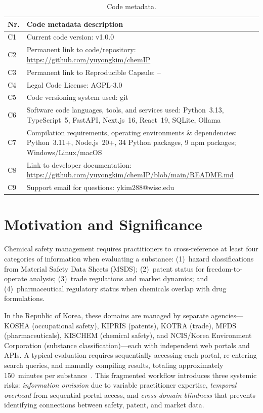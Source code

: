 \documentclass[preprint,12pt]{elsarticle}
\begin{document}
\begin{table}[H]
\caption{Code metadata.}
\label{tab:code_metadata}
\small
\begin{tabular}{@{}lp{9cm}@{}}
\toprule
\textbf{Nr.} & \textbf{Code metadata description} \\
\midrule
C1 & Current code version: v1.0.0 \\
C2 & Permanent link to code/repository: \url{https://github.com/yuyongkim/chemIP} \\
C3 & Permanent link to Reproducible Capsule: -- \\
C4 & Legal Code License: AGPL-3.0 \\
C5 & Code versioning system used: git \\
C6 & Software code languages, tools, and services used: Python~3.13, TypeScript~5, FastAPI, Next.js~16, React~19, SQLite, Ollama \\
C7 & Compilation requirements, operating environments \& dependencies: Python~3.11+, Node.js~20+, 34 Python packages, 9 npm packages; Windows/Linux/macOS \\
C8 & Link to developer documentation: \url{https://github.com/yuyongkim/chemIP/blob/main/README.md} \\
C9 & Support email for questions: ykim288@wisc.edu \\
\bottomrule
\end{tabular}
\end{table}

\section{Motivation and Significance}
\label{sec:motivation}

Chemical safety management requires practitioners to cross-reference at least four categories of information when evaluating a substance: (1)~hazard classifications from Material Safety Data Sheets (MSDS); (2)~patent status for freedom-to-operate analysis; (3)~trade regulations and market dynamics; and (4)~pharmaceutical regulatory status when chemicals overlap with drug formulations.

In the Republic of Korea, these domains are managed by separate agencies---KOSHA (occupational safety), KIPRIS (patents), KOTRA (trade), MFDS (pharmaceuticals), KISCHEM (chemical safety), and NCIS/Korea Environment Corporation (substance classification)---each with independent web portals and APIs.
A typical evaluation requires sequentially accessing each portal, re-entering search queries, and manually compiling results, totaling approximately 150~minutes per substance~\cite{occupational_safety_2023}.
This fragmented workflow introduces three systemic risks: \emph{information omission} due to variable practitioner expertise, \emph{temporal overhead} from sequential portal access, and \emph{cross-domain blindness} that prevents identifying connections between safety, patent, and market data.
\end{document}
